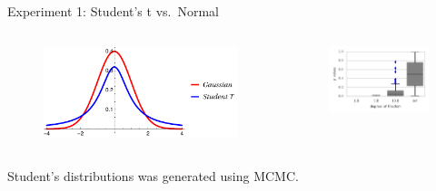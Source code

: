 \documentclass{beamer}
\begin{document}
  \begin{frame}{Experiment 1: Student's t vs.~Normal}
\begin{columns}
        \begin{column}{.5\textwidth}
        \begin{figure}
           \includegraphics[width=\textwidth]{img/nt}   
        \end{figure}
        \end{column}
        \begin{column}{.5\textwidth}
            \begin{figure}
           \includegraphics[width=\textwidth]{img/sgld_student_opt} 
        \end{figure}
        \end{column}
    \end{columns}
Student's distributions was generated using MCMC.
\end{frame}

  \fi

\end{document}
